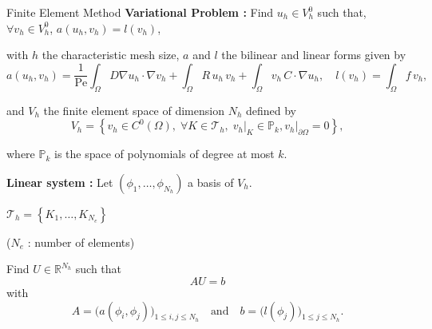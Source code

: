 \begin{frame}{Finite Element Method}	
	\textbf{Variational Problem :} Find $u_h\in V_h^0$ such that, $\forall v_h\in V_h^0$, $a(u_h,v_h)=l(v_h)$, 

	\vspace{1pt}
	with $h$ the characteristic mesh size, $a$ and $l$ the bilinear and linear forms given by
	\vspace{-3pt}
	\begin{equation*}
		a(u_h,v_h)=
		\frac{1}{\text{Pe}} \int_{\Omega}D \nabla u_h \cdot  \nabla v_h+
		\int_{\Omega} R \, u_h \, v_h  +
		\int_{\Omega} v_h \, C \cdot \nabla u_h, \quad l(v_h)=\int_{\Omega} f \, v_h,
	\end{equation*}

	\begin{minipage}[t]{0.7\linewidth}
		\vspace{-3pt}
		and $V_h$ the finite element space of dimension $N_h$ defined by
		\vspace{-3pt}
		\begin{equation*}
			V_h = \left\{v_h\in C^0(\Omega),\; \forall K\in \mathcal{T}_h,\; v_h\vert_{K}\in\mathbb{P}_k,v_h\vert_{\partial\Omega}=0\right\},
		\end{equation*}

		\vspace{-3pt}
		where $\mathbb{P}_k$ is the space of polynomials of degree at most $k$.

		\vspace{10pt}
		\textbf{Linear system :} Let $(\phi_1,\dots,\phi_{N_h})$ a basis of $V_h$.
	\end{minipage} \qquad \begin{minipage}[t][][b]{0.2\linewidth}
		\centering
		
		\footnotesize
		$\mathcal{T}_h = \left\{K_1,\dots,K_{N_e}\right\}$
		
		\tiny
		($N_e$ : number of elements)
	\end{minipage}

	\vspace{-5pt}
	Find $U\in\mathbb{R}^{N_h}$ such that 
	$$AU=b$$	
	with 
	\begin{equation*}
		A=\big(a(\phi_i,\phi_j)\big)_{1\le i,j\le N_h} \quad \text{and} \quad b=\big(l(\phi_j)\big)_{1\le j\le N_h}.
	\end{equation*}
\end{frame}